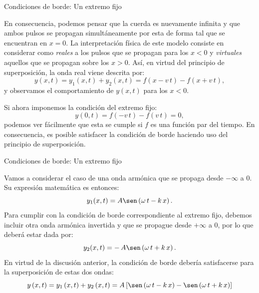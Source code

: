 \documentclass[11pt,handout,aspectratio=1610]{beamer}
\newcommand{\vs}{\vspace{11pt}}
\begin{document}
\begin{frame}{Condiciones de borde: Un extremo fijo}   
    
    En consecuencia, podemos pensar que la cuerda es nuevamente infinita y que ambos pulsos se propagan simultáneamente por esta de forma tal que se encuentran en $x=0$. La interpretación física de este modelo consiste en considerar como \emph{reales} a los pulsos que se propagan para los $x < 0$ y \emph{virtuales} aquellos que se propagan sobre los $x>0$. Así, en virtud del principio de superposición, la onda real viene descrita por: $$ y \left(x,t\right) = y_1 \left(x,t\right) + y_2 \left(x,t\right) = f(x-v \, t) -f \left(x+v \, t\right), $$ y observamos el comportamiento de $y \left(x,t\right)$ para los $x<0$.

    \vs

    Si ahora imponemos la condición del extremo fijo: $$ y \left(0,t\right) = f(-v \, t) - f \left(v \, t\right) = 0, $$ podemos ver fácilmente que esta se cumple si $f$ es una función par del tiempo. En consecuencia, es posible satisfacer la condición de borde haciendo uso del principio de superposición.

\end{frame}

\begin{frame}{Condiciones de borde: Un extremo fijo}   

    Vamos a considerar el caso de una onda armónica que se propaga desde $-\infty$ a $0$. Su expresión matemática es entonces: $$ y_1 (x,t) = A \sen \left(\omega \, t - k \, x\right). $$ Para cumplir con la condición de borde correspondiente al extremo fijo, debemos incluir otra onda armónica invertida y que se propague desde $+\infty$ a $0$, por lo que deberá estar dada por: $$ y_2 (x,t) = - \, A \sen \left(\omega \, t + k \, x\right). $$ En virtud de la discusión anterior, la condición de borde debería satisfacerse para la superposición de estas dos ondas: $$ y \left(x,t\right) = y_1 \left(x,t\right) + y_2 \left(x,t\right) = A \left[\sen \left(\omega \, t - k \, x\right) - \sen \left(\omega \, t + k \, x\right)\right] $$

\end{frame}
\end{document}
